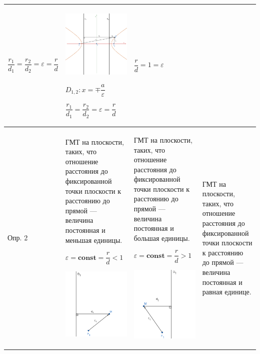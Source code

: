 \documentclass[twoside]{book}
\begin{document}
\begin{center}
\begin{longtable}{|p{2.5cm}|p{4.5cm}|p{4.5cm}|p{4.5cm}|}
        \(\dfrac{r_1}{d_1} = \dfrac{r_2}{d_2} = \varepsilon = \dfrac{r}{d}\)
         &
        \begin{center}
            \includegraphics[width=4.5cm]{Images/Chapter_1/3-1-7.png}
        \end{center}
        \(D_{1, 2}: x = \mp \dfrac{a}{\varepsilon}\)

        \(\dfrac{r_1}{d_1} = \dfrac{r_2}{d_2} = \varepsilon = \dfrac{r}{d}\)
         &
        \(\dfrac{r}{d} = 1 = \varepsilon\)
        \\
        \hline
        Опр. 2
         &
        ГМТ на плоскости, таких, что отношение расстояния до фиксированной точки плоскости к расстоянию до прямой --- величина постоянная и меньшая единицы.

        \(\varepsilon = \mathbf{const} = \dfrac{r}{d} < 1\)
        \begin{center}
            \includegraphics[width=4.5cm]{Images/Chapter_1/3-1-8.png}
        \end{center}
         &
        ГМТ на плоскости, таких, что отношение расстояния до фиксированной точки плоскости к расстоянию до прямой --- величина постоянная и большая единицы.

        \(\varepsilon = \mathbf{const} = \dfrac{r}{d} > 1\)
        \begin{center}
            \includegraphics[width=4.5cm]{Images/Chapter_1/3-1-9.png}
        \end{center}
         &
        ГМТ на плоскости, таких, что отношение расстояния до фиксированной точки плоскости к расстоянию до прямой --- величина постоянная и равная единице.


\end{longtable}
\end{center}
\end{document}
